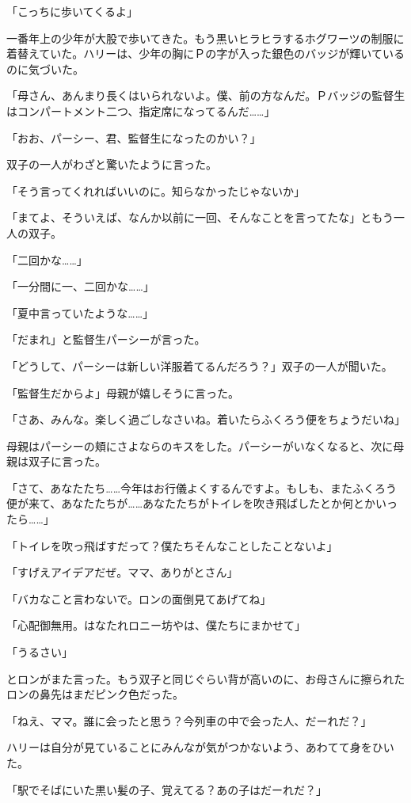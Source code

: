 \documentclass[10pt,a4paper]{article}
\begin{document}
\begin{CJK}{UTF8}{min}
「こっちに歩いてくるよ」

一番年上の少年が大股で歩いてきた。もう黒いヒラヒラするホグワーツの制服に着替えていた。ハリーは、少年の胸にＰの字が入った銀色のバッジが輝いているのに気づいた。

「母さん、あんまり長くはいられないよ。僕、前の方なんだ。Ｐバッジの監督生はコンパートメント二つ、指定席になってるんだ……」

「おお、パーシー、君、監督生になったのかい？」

双子の一人がわざと驚いたように言った。

「そう言ってくれればいいのに。知らなかったじゃないか」

「まてよ、そういえば、なんか以前に一回、そんなことを言ってたな」ともう一人の双子。

「二回かな……」

「一分間に一、二回かな……」

「夏中言っていたような……」

「だまれ」と監督生パーシーが言った。

「どうして、パーシーは新しい洋服着てるんだろう？」双子の一人が聞いた。

「監督生だからよ」母親が嬉しそうに言った。

「さあ、みんな。楽しく過ごしなさいね。着いたらふくろう便をちょうだいね」

母親はパーシーの頬にさよならのキスをした。パーシーがいなくなると、次に母親は双子に言った。

「さて、あなたたち……今年はお行儀よくするんですよ。もしも、またふくろう便が来て、あなたたちが……あなたたちがトイレを吹き飛ばしたとか何とかいったら……」

「トイレを吹っ飛ばすだって？僕たちそんなことしたことないよ」

「すげえアイデアだぜ。ママ、ありがとさん」

「バカなこと言わないで。ロンの面倒見てあげてね」

「心配御無用。はなたれロニー坊やは、僕たちにまかせて」

「うるさい」

とロンがまた言った。もう双子と同じぐらい背が高いのに、お母さんに擦られたロンの鼻先はまだピンク色だった。

「ねえ、ママ。誰に会ったと思う？今列車の中で会った人、だーれだ？」

ハリーは自分が見ていることにみんなが気がつかないよう、あわてて身をひいた。

「駅でそばにいた黒い髪の子、覚えてる？あの子はだーれだ？」


\end{CJK}
\end{document}
